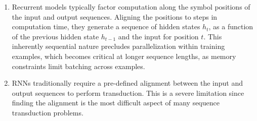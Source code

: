 \begin{enumerate}
    \item Recurrent models typically factor computation along the symbol positions of the input and output sequences. 
    Aligning the positions to steps in computation time, they generate a sequence of hidden states $h_t$, as a function of the previous hidden state $h_{t-1}$ and the input for position $t$. 
    This inherently sequential nature precludes parallelization within training examples, which becomes critical at longer sequence lengths, as memory constraints limit batching across examples.
    \hfill \cite{arxiv/1706.03762/Attention-Is-All-You-Need}

    \item  RNNs traditionally require a pre-defined alignment between the input and output sequences to perform transduction. 
    This is a severe limitation since finding the alignment is the most difficult aspect of many sequence transduction problems. 
    \hfill \cite{arxiv/1211.3711/Sequence-Transduction-RNN}
\end{enumerate}
















